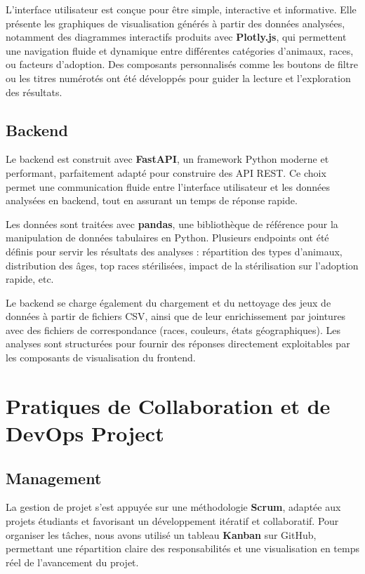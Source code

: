 \documentclass[a4paper,12pt]{article}
\begin{document}
L’interface utilisateur est conçue pour être simple, interactive et informative. Elle présente les graphiques de visualisation générés à partir des données analysées, notamment des diagrammes interactifs produits avec \textbf{Plotly.js}, qui permettent une navigation fluide et dynamique entre différentes catégories d’animaux, races, ou facteurs d’adoption. Des composants personnalisés comme les boutons de filtre ou les titres numérotés ont été développés pour guider la lecture et l’exploration des résultats.

\subsection {Backend}

Le backend est construit avec \textbf{FastAPI}, un framework Python moderne et performant, parfaitement adapté pour construire des API REST. Ce choix permet une communication fluide entre l’interface utilisateur et les données analysées en backend, tout en assurant un temps de réponse rapide.

Les données sont traitées avec \textbf{pandas}, une bibliothèque de référence pour la manipulation de données tabulaires en Python. Plusieurs endpoints ont été définis pour servir les résultats des analyses : répartition des types d’animaux, distribution des âges, top races stérilisées, impact de la stérilisation sur l’adoption rapide, etc.

Le backend se charge également du chargement et du nettoyage des jeux de données à partir de fichiers CSV, ainsi que de leur enrichissement par jointures avec des fichiers de correspondance (races, couleurs, états géographiques). Les analyses sont structurées pour fournir des réponses directement exploitables par les composants de visualisation du frontend.

\section {Pratiques de Collaboration et de DevOps Project}

\subsection {Management}

La gestion de projet s’est appuyée sur une méthodologie \textbf{Scrum}, adaptée aux projets étudiants et favorisant un développement itératif et collaboratif. Pour organiser les tâches, nous avons utilisé un tableau \textbf{Kanban} sur GitHub, permettant une répartition claire des responsabilités et une visualisation en temps réel de l’avancement du projet.
\end{document}
